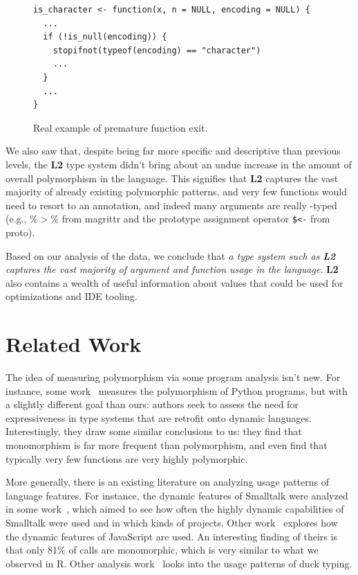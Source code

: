 \documentclass[acmsmall,10pt,review,anonymous]{acmart}\settopmatter{printfolios=true,printccs=false,printacmref=false}
\begin{document}
\begin{figure}[!hb]{\small\begin{lstlisting}[style=R]
is_character <- function(x, n = NULL, encoding = NULL) {
  ...
  if (!is_null(encoding)) {
    stopifnot(typeof(encoding) == "character")
    ...
  }
  ...
}
\end{lstlisting}}\caption{Real example of premature function exit.}\label{fig:stopifnot}\end{figure}

We also saw that, despite being far more specific and descriptive than previous levels, the {\bf L2} type system didn't bring about an undue increase in the amount of overall polymorphism in the language.
This signifies that {\bf L2} captures the vast majority of already existing polymorphic patterns, and very few functions would need to resort to an \ANY annotation, and indeed many arguments are really \ANY-typed (e.g., \%$>$\% from magrittr and the prototype assignment operator {\tt \$<-} from proto).

Based on our analysis of the data, we conclude that {\it a type system such as} \textbf{\emph{L2}} {\it captures the vast majority of argument and function usage in the language}.
{\bf L2} also contains a wealth of useful information about values that could be used for optimizations and IDE tooling.



%
%
%
%
%

%
%
%
%
\section{Related Work}

The idea of measuring polymorphism via some program analysis isn't new.
For instance, some work~\cite{aakerblom2015measuring} measures the polymorphism of Python programs, but with a slightly different goal than ours: authors seek to assess the need for expressiveness in type systems that are retrofit onto dynamic languages.
Interestingly, they draw some similar conclusions to us: they find that monomorphism is far more frequent than polymorphism, and even find that typically very few functions are very highly polymorphic.

More generally, there is an existing literature on analyzing usage patterns of language features.  
For instance, the dynamic features of Smalltalk were analyzed in some work~\cite{callau2011howdevelopers}, which aimed to see how often the highly dynamic capabilities of Smalltalk were used and in which kinds of projects.
Other work~\cite{pldi10a} explores how the dynamic features of JavaScript are used.
An interesting finding of theirs is that only 81\% of calls are monomorphic, which is very similar to what we observed in R.
Other analysis work~\cite{milojkovic2017duck} looks into the usage patterns of duck typing.
\end{document}
